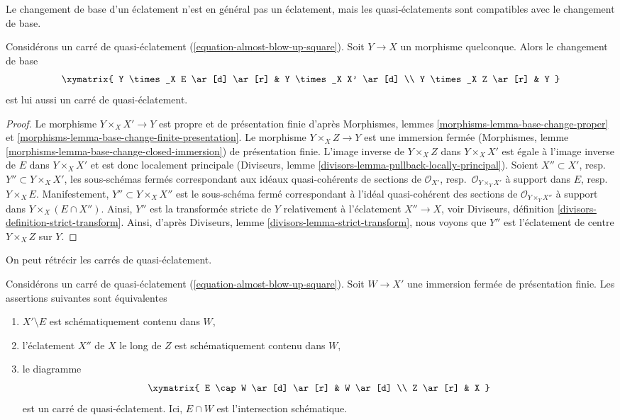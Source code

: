 \medskip\noindent
Le changement de base d'un éclatement n'est en général pas un éclatement,
mais les quasi-éclatements sont compatibles avec le changement de base.

\begin{lemma}
\label{lemma-base-change-almost-blow-up}
Considérons un carré de quasi-éclatement (\ref{equation-almost-blow-up-square}).
Soit $Y \to X$ un morphisme quelconque. Alors le changement de base
$$
\xymatrix{
Y \times_X E \ar[d] \ar[r] & Y \times_X X' \ar[d] \\
Y \times_X Z \ar[r] & Y
}
$$
est lui aussi un carré de quasi-éclatement.
\end{lemma}

\begin{proof}
Le morphisme $Y \times_X X' \to Y$ est propre et de présentation finie
d'après Morphismes, lemmes \ref{morphisms-lemma-base-change-proper} et
\ref{morphisms-lemma-base-change-finite-presentation}.
Le morphisme $Y \times_X Z \to Y$ est une immersion fermée
(Morphismes, lemme \ref{morphisms-lemma-base-change-closed-immersion}) de
présentation finie. L'image inverse de $Y \times_X Z$ dans $Y \times_X X'$
est égale à l'image inverse de $E$ dans $Y \times_X X'$ et est donc
localement principale
(Diviseurs, lemme \ref{divisors-lemma-pullback-locally-principal}).
Soient $X'' \subset X'$, resp.\ $Y'' \subset Y \times_X X'$, les sous-schémas fermés
correspondant aux idéaux quasi-cohérents de sections de
$\mathcal{O}_{X'}$, resp.\ $\mathcal{O}_{Y \times_Y X'}$
à support dans $E$, resp.\ $Y \times_X E$.
Manifestement, $Y'' \subset Y \times_X X''$ est le sous-schéma fermé
correspondant à l'idéal quasi-cohérent des sections de
$\mathcal{O}_{Y \times_Y X''}$ à support dans $Y \times_X (E \cap X'')$.
Ainsi, $Y''$ est la transformée stricte de $Y$ relativement à l'éclatement
$X'' \to X$, voir
Diviseurs, définition \ref{divisors-definition-strict-transform}.
Ainsi, d'après Diviseurs, lemme \ref{divisors-lemma-strict-transform},
nous voyons que $Y''$ est l'éclatement de centre $Y \times_X Z$ sur $Y$.
\end{proof}

\noindent
On peut rétrécir les carrés de quasi-éclatement.

\begin{lemma}
\label{lemma-shrink-almost-blow-up}
Considérons un carré de quasi-éclatement (\ref{equation-almost-blow-up-square}).
Soit $W \to X'$ une immersion fermée de présentation finie.
Les assertions suivantes sont équivalentes
\begin{enumerate}
\item $X' \setminus E$ est schématiquement contenu dans $W$,
\item l'éclatement $X''$ de $X$ le long de $Z$ est schématiquement contenu dans $W$,
\item le diagramme
$$
\xymatrix{
E \cap W \ar[d] \ar[r] & W \ar[d] \\
Z \ar[r] & X
}
$$
est un carré de quasi-éclatement. Ici, $E \cap W$ est l'intersection
schématique.
\end{enumerate}
\end{lemma}

